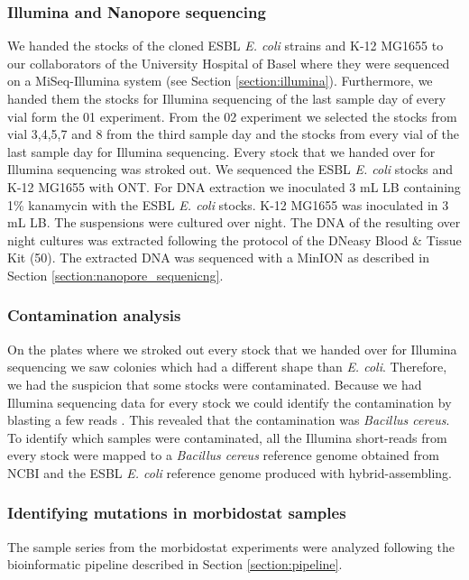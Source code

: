 \subsubsection{Illumina and Nanopore sequencing}
We handed the stocks of the cloned ESBL \textit{E. coli} strains and K-12 MG1655 to our collaborators of the University Hospital of Basel where they were sequenced on a MiSeq-Illumina system (see Section \ref{section:illumina}).
Furthermore, we handed them the stocks for Illumina sequencing of the last sample day of every vial form the 01 experiment. 
From the 02 experiment we selected the stocks from vial 3,4,5,7 and 8 from the third sample day and the stocks from every vial of the last sample day for Illumina sequencing. Every stock that we handed over for Illumina sequencing was stroked out. 
We sequenced the ESBL \textit{E. coli} stocks and K-12 MG1655 with ONT. For DNA extraction we inoculated 3 mL LB containing 1\% kanamycin with the ESBL \textit{E. coli} stocks. K-12 MG1655 was inoculated in 3 mL LB. The suspensions were cultured over night. The DNA of the resulting over night cultures was extracted following the protocol of the DNeasy Blood \& Tissue Kit (50). The extracted DNA was sequenced with a MinION as described in Section \ref{section:nanopore_sequenicng}. 

\subsubsection{Contamination analysis}
On the plates where we stroked out every stock that we handed over for Illumina sequencing we saw colonies which had a different shape than \textit{E. coli}. Therefore, we had the suspicion that some stocks were contaminated. Because we had Illumina sequencing data for every stock we could identify the contamination by blasting a few reads \cite{madden_blast_2003}. This revealed that the contamination was \textit{Bacillus cereus}. To identify which samples were contaminated, all the Illumina short-reads from every stock  were mapped to a \textit{Bacillus cereus} reference genome obtained from NCBI \cite{noauthor_bacillus_nodate} and the ESBL \textit{E. coli} reference genome produced with hybrid-assembling.

\subsubsection{Identifying mutations in morbidostat samples}
The sample series from the morbidostat experiments were analyzed following the bioinformatic pipeline described in Section \ref{section:pipeline}. 